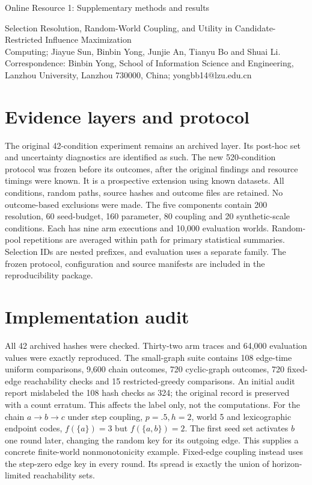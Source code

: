 \documentclass[11pt]{article}
\begin{document}
\begin{center}\Large Online Resource 1: Supplementary methods and results\end{center}
\noindent Selection Resolution, Random-World Coupling, and Utility in Candidate-Restricted Influence Maximization\\
Computing; Jiayue Sun, Binbin Yong, Junjie An, Tianyu Bo and Shuai Li.\\
Correspondence: Binbin Yong, School of Information Science and Engineering, Lanzhou University, Lanzhou 730000, China; yongbb14@lzu.edu.cn
\section{Evidence layers and protocol}
The original 42-condition experiment remains an archived layer. Its post-hoc set and uncertainty diagnostics are identified as such. The new 520-condition protocol was frozen before its outcomes, after the original findings and resource timings were known. It is a prospective extension using known datasets. All conditions, random paths, source hashes and outcome files are retained. No outcome-based exclusions were made.
The five components contain 200 resolution, 60 seed-budget, 160 parameter, 80 coupling and 20 synthetic-scale conditions. Each has nine arm executions and 10,000 evaluation worlds. Random-pool repetitions are averaged within path for primary statistical summaries. Selection IDs are nested prefixes, and evaluation uses a separate family. The frozen protocol, configuration and source manifests are included in the reproducibility package.
\section{Implementation audit}
All 42 archived hashes were checked. Thirty-two arm traces and 64,000 evaluation values were exactly reproduced. The small-graph suite contains 108 edge-time uniform comparisons, 9,600 chain outcomes, 720 cyclic-graph outcomes, 720 fixed-edge reachability checks and 15 restricted-greedy comparisons. An initial audit report mislabeled the 108 hash checks as 324; the original record is preserved with a count erratum. This affects the label only, not the computations.
For the chain $a\to b\to c$ under step coupling, $p=.5,h=2$, world 5 and lexicographic endpoint codes, $f(\{a\})=3$ but $f(\{a,b\})=2$. The first seed set activates $b$ one round later, changing the random key for its outgoing edge. This supplies a concrete finite-world nonmonotonicity example. Fixed-edge coupling instead uses the step-zero edge key in every round. Its spread is exactly the union of horizon-limited reachability sets.
\end{document}
